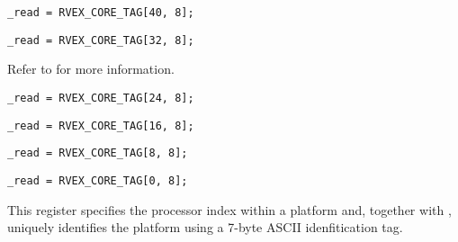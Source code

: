 \implementation{}
\begin{lstlisting}
_read = RVEX_CORE_TAG[40, 8];
\end{lstlisting}

\implementation{}
\begin{lstlisting}
_read = RVEX_CORE_TAG[32, 8];
\end{lstlisting}


Refer to  for more information.

\implementation{}
\begin{lstlisting}
_read = RVEX_CORE_TAG[24, 8];
\end{lstlisting}

\implementation{}
\begin{lstlisting}
_read = RVEX_CORE_TAG[16, 8];
\end{lstlisting}

\implementation{}
\begin{lstlisting}
_read = RVEX_CORE_TAG[8, 8];
\end{lstlisting}

\implementation{}
\begin{lstlisting}
_read = RVEX_CORE_TAG[0, 8];
\end{lstlisting}


This register specifies the processor index within a platform and, together with
, uniquely identifies the platform using a 7-byte ASCII
idenfitication tag.

